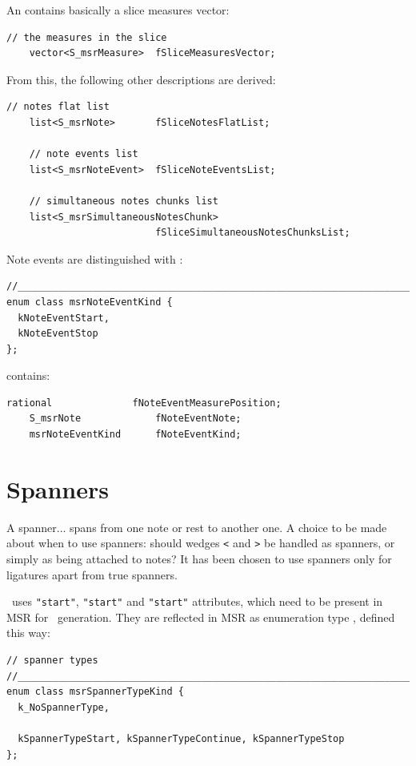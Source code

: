 An  contains basically a slice measures vector:
\begin{lstlisting}[language=CPlusPlus]
    // the measures in the slice
    vector<S_msrMeasure>  fSliceMeasuresVector;
\end{lstlisting}

From this, the following other descriptions are derived:
\begin{lstlisting}[language=CPlusPlus]
    // notes flat list
    list<S_msrNote>       fSliceNotesFlatList;

    // note events list
    list<S_msrNoteEvent>  fSliceNoteEventsList;

    // simultaneous notes chunks list
    list<S_msrSimultaneousNotesChunk>
                          fSliceSimultaneousNotesChunksList;
\end{lstlisting}

Note events are distinguished with :
\begin{lstlisting}[language=CPlusPlus]
//________________________________________________________________________
enum class msrNoteEventKind {
  kNoteEventStart,
  kNoteEventStop
};
\end{lstlisting}

 contains:
\begin{lstlisting}[language=CPlusPlus]
    rational              fNoteEventMeasurePosition;
    S_msrNote             fNoteEventNote;
    msrNoteEventKind      fNoteEventKind;

\end{lstlisting}



\section{Spanners}\label{Spanners}

A spanner... spans from one note or rest to another one. A choice to be made about when to use spanners: should
wedges {\tt <} and {\tt >} be handled as spanners, or simply as being attached to notes? It has been chosen to use spanners only for ligatures apart from true spanners.

\mxml\ uses {\tt "start"}, {\tt "start"} and {\tt "start"} attributes, which need to be present in MSR for \mxml\ generation. They are reflected in MSR as enumeration type , defined this way:
\begin{lstlisting}[language=CPlusPlus]
// spanner types
//______________________________________________________________________________
enum class msrSpannerTypeKind {
  k_NoSpannerType,

  kSpannerTypeStart, kSpannerTypeContinue, kSpannerTypeStop
};
\end{lstlisting}


